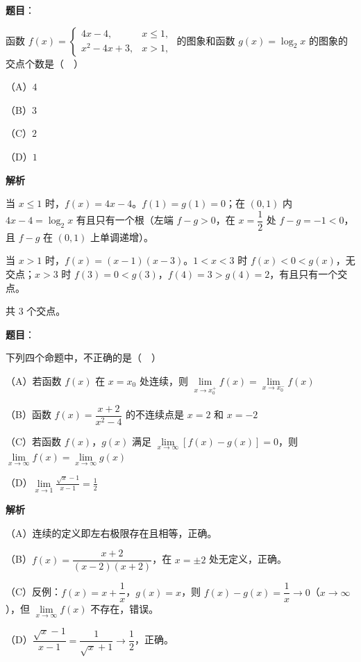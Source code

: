 \begin{answer}

\textbf{题目}：

函数 $f(x)=\begin{cases}4x-4,&x\leqslant1,\\ x^2-4x+3,&x>1,\end{cases}$ 的图象和函数 $g(x)=\log_2x$ 的图象的交点个数是（　）

（A）$4$

（B）$3$

（C）$2$

（D）$1$

\textbf{解析}

当 $x\leqslant1$ 时，$f(x)=4x-4$。$f(1)=g(1)=0$；在 $(0,1)$ 内 $4x-4=\log_2x$ 有且只有一个根（左端 $f-g>0$，在 $x=\dfrac12$ 处 $f-g=-1<0$，且 $f-g$ 在 $(0,1)$ 上单调递增）。

当 $x>1$ 时，$f(x)=(x-1)(x-3)$。$1<x<3$ 时 $f(x)<0<g(x)$，无交点；$x>3$ 时 $f(3)=0<g(3)$，$f(4)=3>g(4)=2$，有且只有一个交点。

共 $3$ 个交点。


\end{answer}
\begin{answer}

\textbf{题目}：

下列四个命题中，不正确的是（　）

（A）若函数 $f(x)$ 在 $x=x_0$ 处连续，则 $\lim\limits_{x\to x_0^+}f(x)=\lim\limits_{x\to x_0^-}f(x)$

（B）函数 $f(x)=\dfrac{x+2}{x^2-4}$ 的不连续点是 $x=2$ 和 $x=-2$

（C）若函数 $f(x)$，$g(x)$ 满足 $\lim\limits_{x\to\infty}[f(x)-g(x)]=0$，则 $\lim\limits_{x\to\infty}f(x)=\lim\limits_{x\to\infty}g(x)$

（D）$\lim\limits_{x\to1}\frac{\sqrt x-1}{x-1}=\frac12$

\textbf{解析}

（A）连续的定义即左右极限存在且相等，正确。

（B）$f(x)=\dfrac{x+2}{(x-2)(x+2)}$，在 $x=\pm2$ 处无定义，正确。

（C）反例：$f(x)=x+\dfrac1x$，$g(x)=x$，则 $f(x)-g(x)=\dfrac1x\to0$（$x\to\infty$），但 $\lim\limits_{x\to\infty}f(x)$ 不存在，错误。

（D）$\dfrac{\sqrt x-1}{x-1}=\dfrac1{\sqrt x+1}\to\dfrac12$，正确。


\end{answer}
